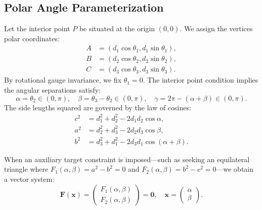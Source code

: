 \subsection{Polar Angle Parameterization}
Let the interior point $P$ be situated at the origin $(0,0)$. We assign the vertices polar coordinates:
\begin{align}
A &= (d_1 \cos \theta_1, d_1 \sin \theta_1), \\
B &= (d_2 \cos \theta_2, d_2 \sin \theta_2), \\
C &= (d_3 \cos \theta_3, d_3 \sin \theta_3).
\end{align}
By rotational gauge invariance, we fix $\theta_1 = 0$. The interior point condition implies the angular separations satisfy:
\begin{equation}
\alpha = \theta_2 \in (0, \pi), \quad \beta = \theta_3 - \theta_2 \in (0, \pi), \quad \gamma = 2\pi - (\alpha + \beta) \in (0, \pi).
\end{equation}
The side lengths squared are governed by the law of cosines:
\begin{align}
c^2 &= d_1^2 + d_2^2 - 2d_1 d_2 \cos \alpha, \\
a^2 &= d_2^2 + d_3^2 - 2d_2 d_3 \cos \beta, \\
b^2 &= d_3^2 + d_1^2 - 2d_3 d_1 \cos(\alpha + \beta).
\end{align}

When an auxiliary target constraint is imposed---such as seeking an equilateral triangle where $F_1(\alpha, \beta) = a^2 - b^2 = 0$ and $F_2(\alpha, \beta) = b^2 - c^2 = 0$---we obtain a vector system:
\begin{equation}
\mathbf{F}(\mathbf{x}) = \begin{pmatrix} F_1(\alpha, \beta) \\ F_2(\alpha, \beta) \end{pmatrix} = \mathbf{0}, \quad \mathbf{x} = \begin{pmatrix} \alpha \\ \beta \end{pmatrix}.
\end{equation}

